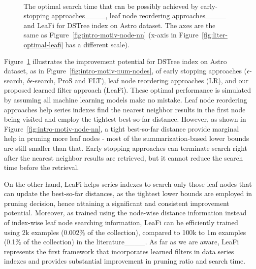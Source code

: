 \begin{figure}[tb]
  \centering
  
  \\[-2ex]
  
  \setcounter{subfigure}{0}
    
  \vspace*{-0.2cm}
  \caption{The optimal search time that can be possibly achieved by early-stopping approaches____, leaf node reordering approaches____ and LeaFi for DSTree index on Astro dataset.
  The axes are the same as Figure~\ref{fig:intro-motiv-node-nn} (x-axis in Figure~\ref{fig:liter-optimal-leafi} has a different scale).
  }
  \label{fig:liter-comparison}
\end{figure}

Figure~\ref{fig:liter-comparison} illustrates the improvement potential for DSTree index on Astro dataset, as in Figure~\ref{fig:intro-motiv-num-nodes}, of early stopping approaches ($\epsilon$-search, $\delta\epsilon$-search, ProS and FLT), leaf node reordering approaches (LR), and our proposed learned filter approach (LeaFi).
These optimal performance is simulated by assuming all machine learning models make no mistake.
Leaf node reordering approaches help series indexes find the nearest neighbor results in the first node being visited and employ the tightest best-so-far distance.
However, as shown in Figure~\ref{fig:intro-motiv-node-nn}, a tight best-so-far distance provide marginal help in pruning more leaf nodes - most of the summarization-based lower bounds are still smaller than that. 
Early stopping approaches can terminate search right after the nearest neighbor results are retrieved, but it cannot reduce the search time before the retrieval. 

On the other hand, LeaFi helps series indexes to search only those leaf nodes that can update the best-so-far distances, as the tightest lower bounds are employed in pruning decision, hence attaining a significant and consistent improvement potential.
Moreover, as trained using the node-wise distance information instead of index-wise leaf node searching information, LeaFi can be efficiently trained using 2k examples (0.002\% of the collection), compared to 100k to 1m examples (0.1\% of the collection) in the literature____.
As far as we are aware, LeaFi represents the first framework that incorporates learned filters in data series indexes and provides substantial improvement in pruning ratio and search time.

